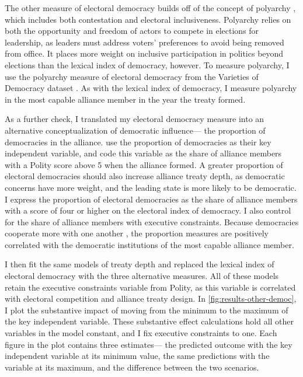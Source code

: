 \documentclass[12pt]{article}
\begin{document}
The other measure of electoral democracy builds off of the concept of polyarchy \citep{Dahl1971}, which includes both contestation and electoral inclusiveness. 
Polyarchy relies on both the opportunity and freedom of actors to compete in elections for leadership, as leaders must address voters' preferences to avoid being removed from office. 
It places more weight on inclusive participation in politics beyond elections than the lexical index of democracy, however. 
To measure polyarchy, I use the polyarchy measure of electoral democracy from the Varieties of Democracy dataset \citep{Teorelletal2016}.
As with the lexical index of democracy, I measure polyarchy in the most capable alliance member in the year the treaty formed.



As a further check, I translated my electoral democracy measure into an alternative conceptualization of democratic influence--- the proportion of democracies in the alliance.
\citet{Chibaetal2015} use the proportion of democracies as their key independent variable, and code this variable as the share of alliance members with a Polity score above 5 when the alliance formed. 
A greater proportion of electoral democracies should also increase alliance treaty depth, as democratic concerns have more weight, and the leading state is more likely to be democratic. 
I express the proportion of electoral democracies as the share of alliance members with a score of four or higher on the electoral index of democracy. 
I also control for the share of alliance members with executive constraints. 
Because democracies cooperate more with one another \citep{Leeds1999}, the proportion measures are positively correlated with the democratic institutions of the most capable alliance member. 
 
I then fit the same models of treaty depth and replaced the lexical index of electoral democracy with the three alternative measures.
All of these models retain the executive constraints variable from Polity, as this variable is correlated with electoral competition and alliance treaty design. 
In \autoref{fig:results-other-democ}, I plot the substantive impact of moving from the minimum to the maximum of the key independent variable. 
These substantive effect calculations hold all other variables in the model constant, and I fix executive constraints to one. 
Each figure in the plot contains three estimates--- the predicted outcome with the key independent variable at its minimum value, the same predictions with the variable at its maximum, and the difference between the two scenarios. 
\end{document}
